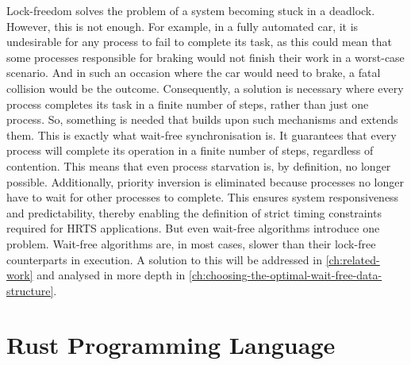 Lock-freedom solves the problem of a system becoming stuck in a deadlock. However, this is not enough. For example, in a fully automated car, it is undesirable for any process to fail to complete its task, as this could mean that some processes responsible for braking would not finish their work in a worst-case scenario. And in such an occasion where the car would need to brake, a fatal collision would be the outcome. Consequently, a solution is necessary where every process completes its task in a finite number of steps, rather than just one process. So, something is needed that builds upon such mechanisms and extends them. This is exactly what wait-free synchronisation is. It guarantees that every process will complete its operation in a finite number of steps, regardless of contention. This means that even process starvation is, by definition, no longer possible. Additionally, priority inversion is eliminated because processes no longer have to wait for other processes to complete. This ensures system responsiveness and predictability, thereby enabling the definition of strict timing constraints required for \ac{HRTS} applications. But even wait-free algorithms introduce one problem. Wait-free algorithms are, in most cases, slower than their lock-free counterparts in execution. A solution to this will be addressed in \cref{ch:related-work} and analysed in more depth in \cref{ch:choosing-the-optimal-wait-free-data-structure}.

\section{Rust Programming Language}\label{sec:rust}

